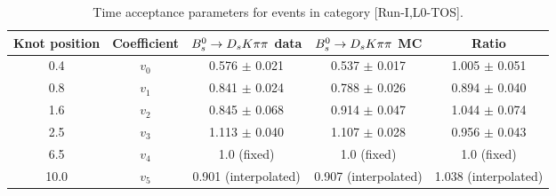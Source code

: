 \begin{table}[hp!]
\centering
\small
\caption{Time acceptance parameters for events in category [\textsf{Run-I},\textsf{L0-TOS}].}
\begin{tabular}{c c c c c}
\hline
\hline
Knot position & Coefficient & ${{B}^0_{s}}\rightarrow{\ensuremath{{D}_{s}}}{\ensuremath{K}}{\ensuremath{\pi}}{\ensuremath{\pi}}$ data & ${{B}^0_{s}}\rightarrow{\ensuremath{{D}_{s}}}{\ensuremath{K}}{\ensuremath{\pi}}{\ensuremath{\pi}}$ MC & Ratio \\
\hline
0.4 & $v_{0}$ & 0.576 $\pm$ 0.021 & 0.537 $\pm$ 0.017 & 1.005 $\pm$ 0.051\\
0.8 & $v_{1}$ & 0.841 $\pm$ 0.024 & 0.788 $\pm$ 0.026 & 0.894 $\pm$ 0.040\\
1.6 & $v_{2}$ & 0.845 $\pm$ 0.068 & 0.914 $\pm$ 0.047 & 1.044 $\pm$ 0.074\\
2.5 & $v_{3}$ & 1.113 $\pm$ 0.040 & 1.107 $\pm$ 0.028 & 0.956 $\pm$ 0.043\\
6.5 & $v_{4}$ &  1.0 (fixed) & 1.0 (fixed) & 1.0 (fixed)\\
10.0 & $v_{5}$ & 0.901 (interpolated) & 0.907 (interpolated) & 1.038 (interpolated) \\
\hline
\hline
\end{tabular}
\label{table:splines}
\end{table}